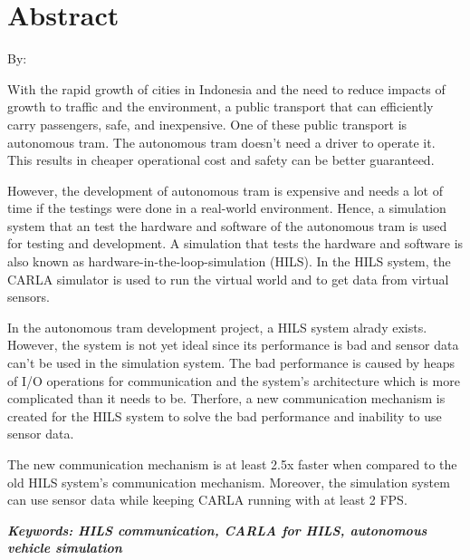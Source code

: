 \clearpage
\chapter*{Abstract}

\begin{center}
	\bfseries \MakeUppercase{\thetitleEn}

	\normalfont\normalsize
	By:

	\theauthor
\end{center}

\begin{singlespace}
	With the rapid growth of cities in Indonesia and the need to reduce impacts
	of growth to traffic and the environment, a public transport that can
	efficiently carry passengers, safe, and inexpensive.  One of these public
	transport is autonomous tram. The autonomous tram doesn't need a driver to
	operate it. This results in cheaper operational cost and safety can be
	better guaranteed.

	However, the development of autonomous tram is expensive and needs a lot of
	time if the testings were done in a real-world environment. Hence, a
	simulation system that an test the hardware and software of the autonomous
	tram is used for testing and development. A simulation that tests the
	hardware and software is also known as hardware-in-the-loop-simulation
	(HILS). In the HILS system, the CARLA simulator is used to run the virtual
	world and to get data from virtual sensors.

	In the autonomous tram development project, a HILS system alrady exists.
	However, the system is not yet ideal since its performance is bad and sensor
	data can't be used in the simulation system. The bad performance is caused
	by heaps of I/O operations for communication and the system's architecture
	which is more complicated than it needs to be. Therfore, a new communication
	mechanism is created for the HILS system to solve the bad performance and
	inability to use sensor data.

	The new communication mechanism is at least 2.5x faster when compared to the
	old HILS system's communication mechanism. Moreover, the simulation system
	can use sensor data  while keeping CARLA running with at least 2 FPS.

	\textbf{\textit{Keywords: HILS communication, CARLA for HILS, autonomous
			vehicle simulation}}
\end{singlespace}

\clearpage
